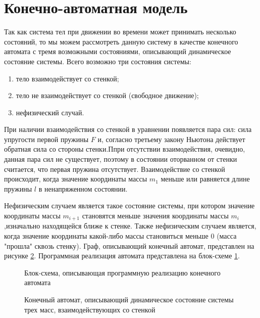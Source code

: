 \section{Конечно-автоматная модель}

 Так как система тел при движении во времени может принимать несколько состояний, то мы можем рассмотреть данную систему в качестве  конечного автомата с тремя возможными состояниями, описывающий динамическое состояние системы. Всего возможно три состояния системы:
\begin{enumerate}
	\item тело взаимодействует со стенкой;
	\item тело не взаимодействует со стенкой (свободное движение);
	\item нефизический случай.
\end{enumerate}

При наличии взаимодействия со стенкой в уравнении появляется пара сил: сила упругости первой пружины $F$ и, согласно третьему закону Ньютона действует обратная сила со стороны стенки.Ппри отсутствии взаимодействия, очевидно, данная пара сил не существует, поэтому в состоянии оторванном от стенки считается, что первая пружина отсутствует. Взаимодействие со стенкой происходит, когда значение координаты массы $m_1$ меньше или равняется длине пружины  $l$ в ненапряженном состоянии.

 Нефизическим случаем является такое состояние системы, при котором значение координаты массы $m_{i+1}$ становятся меньше значения координаты массы $m_i$,изначально находящейся ближе к стенке. Также нефизическим случаем является, когда значение координаты какой-либо массы становиться меньше 0 (масса "прошла" сквозь стенку). Граф, описывающий конечный автомат, представлен на рисунке 
 \ref{fig:avtomat}. Программная реализация автомата представлена на блок-схеме \ref{fig:konavtbs}.


\newpage
\begin{figure}
    \centering
    \scalebox{0.5}{}
    \caption{Блок-схема, описывающая программную реализацию конечного автомата}
    \label{fig:konavtbs}
\end{figure}

\begin{figure}
    \centering
    \scalebox{0.6}{}
    \caption{Конечный автомат, описывающий динамическое состояние системы трех масс, взаимодействующих со стенкой}
    \label{fig:avtomat}
\end{figure}

